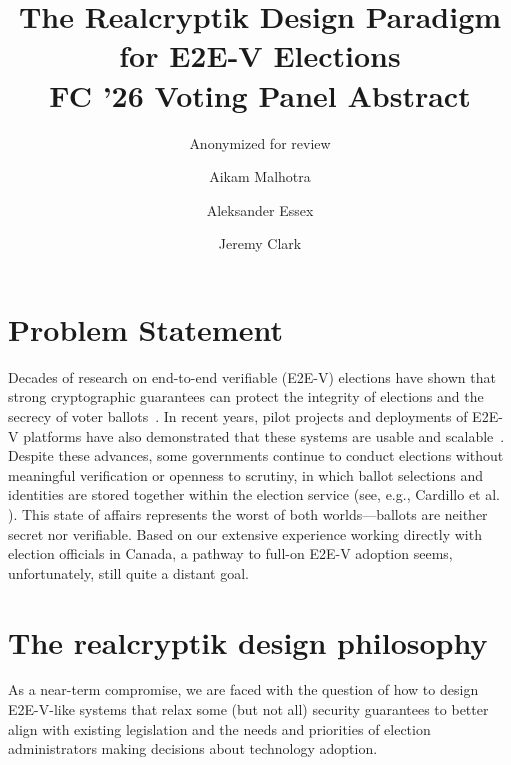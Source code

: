 \documentclass[runningheads]{llncs}
\begin{document}
\title{The Realcryptik Design Paradigm for E2E-V Elections\\{\normalsize FC '26 Voting Panel Abstract}}
\author{Anonymized for review}
\institute{}


\author{
	Aikam Malhotra\and 
	Aleksander Essex \and 
	Jeremy Clark
	}



\maketitle



% 

\section*{Problem Statement}
Decades of research on end-to-end verifiable (E2E-V) elections have shown that strong cryptographic guarantees can protect the integrity of elections and the secrecy of voter ballots~\cite{HR16}. In recent years, pilot projects and deployments of E2E-V platforms have also demonstrated that these systems are usable and scalable~\cite{AMPQ09,CCC+10,BBB+13,CRST15}. 
Despite these advances, some governments continue to conduct elections without meaningful verification or openness to scrutiny, in which ballot selections and identities are stored together within the election service (see, e.g., Cardillo et al. \cite{cae19}). This state of affairs represents the worst of both worlds---ballots are neither secret nor verifiable. Based on our extensive experience working directly with election officials in Canada, a pathway to full-on E2E-V adoption seems, unfortunately, still quite a distant goal.

\section*{The realcryptik design philosophy}

As a near-term compromise, we are faced with the question of how to design E2E-V-like systems that relax some (but not all) security guarantees to better align with existing legislation and the needs and priorities of election administrators making decisions about technology adoption.
\end{document}
